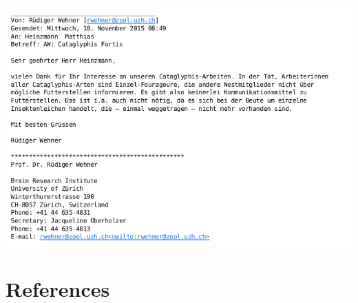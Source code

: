 \documentclass[11pt]{article}
\begin{document}
\includegraphics[scale=0.8]{./RWehner.png}%


\section{References}
  

\nocite{Wehner2008}
\nocite{Wehner2003}
\nocite{Wehner1988}
\nocite{GordonTeam2008}
\nocite{Mathworks2015}
\thispagestyle{plain}
\end{document}
